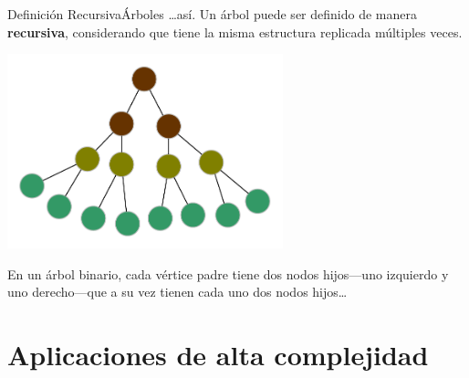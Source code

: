 \documentclass[spanish, c]{beamer}
\begin{document}
\begin{frame}{Definición Recursiva}{Árboles}
\dots así. Un árbol puede ser definido de manera \textbf{recursiva}, considerando que tiene la misma estructura replicada múltiples veces.
\begin{center}
    \includegraphics[width=0.6\textwidth]{binarytree.pdf}
\end{center}
En un \alert{árbol binario}, cada vértice padre tiene dos nodos hijos---uno izquierdo y uno derecho---que a su vez tienen cada uno dos nodos hijos\dots
\end{frame}

\section{Aplicaciones de alta complejidad}
\end{document}

